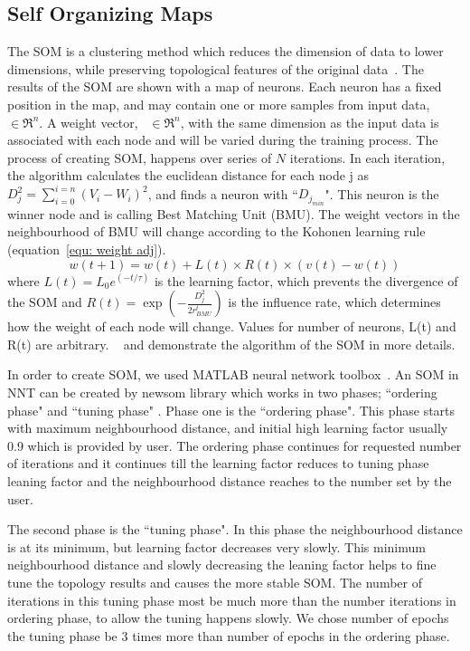  \subsection{Self Organizing Maps}
 \label{sec: som}
 The SOM is a clustering method which reduces the dimension of data to lower dimensions, while preserving topological features of the original data~\citep{Kohonen98}. 
 The results of the SOM are shown with a map of neurons.
 Each neuron has a fixed position in the map, and may contain one or more samples from input data,  $\in \Re^n$.
 A weight vector,~ $\in \Re^n$, with the same dimension as the input data is associated with each node and will be varied during the training process.
 The process of creating SOM, happens over series of $N$ iterations.
 In each iteration, the algorithm calculates the euclidean distance for each node j as  $D_j^2= \sum_{i=0}^{i=n} (V_i - W_i)^2$, and finds a neuron with ``$D_{j_{min}}$". 
 This neuron is the winner node and is calling Best Matching Unit (BMU). 
 The weight vectors in the neighbourhood of BMU will change according to the Kohonen learning rule (equation~\ref{equ: weight adj}). 
  \begin{equation}
            \label{equ: weight adj}
            w(t+1)=w(t)+L(t) \times R(t) \times(v(t)-w(t))
 \end{equation}
where $L(t) = L_0 e^{(-t/\tau)}$ is the learning factor, which prevents the divergence of the SOM and $R(t)=\exp(-\frac{D_j^2}{2r^t_{BMU}})$ is the influence rate, which determines how the weight of each node will change.
Values for number of neurons, L(t) and R(t) are arbitrary. 
~\cite{Geach12} and \cite{Rahmani16b} demonstrate the algorithm of the SOM in more details.


     In order to create SOM, we used {\sc MATLAB} neural network toolbox~\citep[NNT,][]{matlabtolbox}.
     An SOM in {\sc NNT} can be created by {\sc newsom} library which works in two phases; ``ordering phase" and ``tuning phase" . 
     Phase one is the ``ordering phase". 
     This phase starts with maximum neighbourhood distance, and initial high learning factor usually 0.9 which is provided by user. 
     The ordering phase continues for requested number of iterations and it continues till the learning factor reduces to tuning phase leaning factor and the neighbourhood distance reaches to the number set by the user.
     
     The second phase is the ``tuning phase".
     In this phase the neighbourhood distance is at its minimum, but learning factor decreases very slowly.
     This minimum neighbourhood distance and slowly decreasing the leaning factor helps to fine tune the topology results and causes the more stable SOM. 
     The number of iterations in this tuning phase most be much more than the number iterations in ordering phase, to allow the tuning happens slowly. 
     We chose number of epochs the tuning phase be 3 times more than number of epochs in the ordering phase.
     
